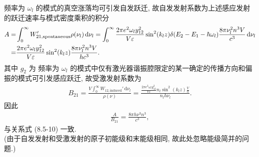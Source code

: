 \documentclass{note}
\begin{document}
\begin{pf}
    频率为 $\omega_l$ 的模式的真空涨落均可引发自发跃迁, 故自发发射系数为上述感应发射的跃迁速率与模式密度乘积的积分
    \begin{align}
        \notag A=&\int_0^{\infty}W_{21,\text{spontaneous}}'\rho(\nu_l)\,\mathrm{d}\nu_l=\int_0^{\infty}\frac{2\pi e^2\omega_ly_{12}^2}{V\varepsilon}\sin^2(k_lz)\delta(E_2-E_1-\hbar\omega_l)\frac{8\pi\nu_l^2n^3V}{c^3}\,\mathrm{d}\nu_l\\
        =&\frac{2\pi e^2\omega_ly_{12}^2}{V\varepsilon}\sin^2(k_lz)\frac{8\pi\nu_l^2n^3V}{hc^3}.
    \end{align}
    其中 $g_2$ 为
    频率为 $\omega_l$ 的模式中仅有激光器谐振腔限定的某一确定的传播方向和偏振的模式可引发感应跃迁, 故受激发射系数为
    \begin{align}
        B_{21}=\frac{V\int_0^{\infty}W_{12,\text{induced}}'\,\mathrm{d}\nu_l}{\rho(\nu)}=\frac{\frac{2\pi e^2\omega_ly_{12}^2}{V\varepsilon}n_l\sin^2(k_lz)\frac{V}{h}}{n_lh\nu_l}.
    \end{align}
    因此
    \begin{align}
        \frac{A}{B_{21}}=\frac{8\pi h\nu^3n^3}{c^3},
    \end{align}
    与关系式 (8.5-10) 一致.\\
    (由于自发发射和受激发射的原子初能级和末能级相同, 故此处忽略能级简并的问题.)
\end{pf}
\end{document}
